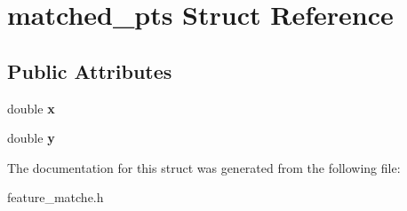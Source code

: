 \hypertarget{structmatched__pts}{\section{matched\-\_\-pts Struct Reference}
\label{structmatched__pts}
}
\subsection*{Public Attributes}
\begin{DoxyCompactItemize}
\item 
\hypertarget{structmatched__pts_a09003a244932c0cf19dc9aaaf4f2c49f}{double {\bfseries x}}\label{structmatched__pts_a09003a244932c0cf19dc9aaaf4f2c49f}

\item 
\hypertarget{structmatched__pts_a5d97fd737142256bb0bbdf3de3f9f0a9}{double {\bfseries y}}\label{structmatched__pts_a5d97fd737142256bb0bbdf3de3f9f0a9}

\end{DoxyCompactItemize}


The documentation for this struct was generated from the following file\-:\begin{DoxyCompactItemize}
\item 
feature\-\_\-matche.\-h\end{DoxyCompactItemize}
